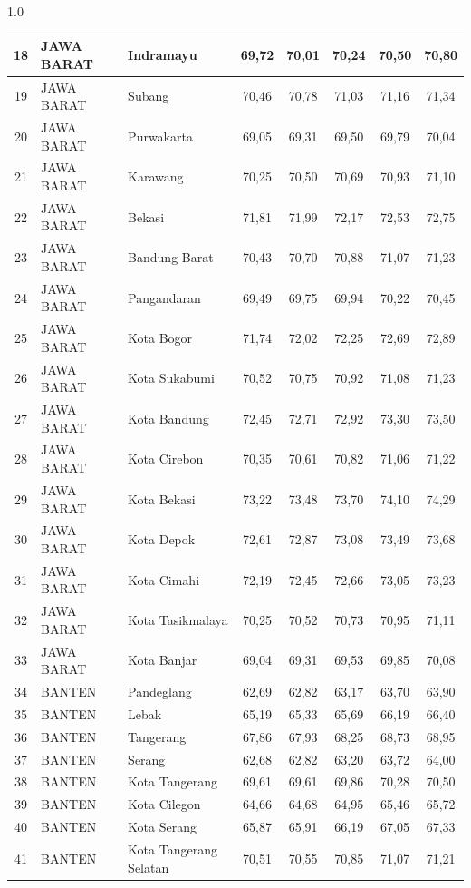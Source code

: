 \begin{spacing}{1.0}
\begin{longtable}{|c|p{2.2cm}|p{2.8cm}|c|c|c|c|c|}
18 & JAWA BARAT & Indramayu & 69,72 & 70,01 & 70,24 & 70,50 & 70,80 \\ \hline
19 & JAWA BARAT & Subang & 70,46 & 70,78 & 71,03 & 71,16 & 71,34 \\ \hline
20 & JAWA BARAT & Purwakarta & 69,05 & 69,31 & 69,50 & 69,79 & 70,04 \\ \hline
21 & JAWA BARAT & Karawang & 70,25 & 70,50 & 70,69 & 70,93 & 71,10 \\ \hline
22 & JAWA BARAT & Bekasi & 71,81 & 71,99 & 72,17 & 72,53 & 72,75 \\ \hline
23 & JAWA BARAT & Bandung Barat & 70,43 & 70,70 & 70,88 & 71,07 & 71,23 \\ \hline
24 & JAWA BARAT & Pangandaran & 69,49 & 69,75 & 69,94 & 70,22 & 70,45 \\ \hline
25 & JAWA BARAT & Kota Bogor & 71,74 & 72,02 & 72,25 & 72,69 & 72,89 \\ \hline
26 & JAWA BARAT & Kota Sukabumi & 70,52 & 70,75 & 70,92 & 71,08 & 71,23 \\ \hline
27 & JAWA BARAT & Kota Bandung & 72,45 & 72,71 & 72,92 & 73,30 & 73,50 \\ \hline
28 & JAWA BARAT & Kota Cirebon & 70,35 & 70,61 & 70,82 & 71,06 & 71,22 \\ \hline
29 & JAWA BARAT & Kota Bekasi & 73,22 & 73,48 & 73,70 & 74,10 & 74,29 \\ \hline
30 & JAWA BARAT & Kota Depok & 72,61 & 72,87 & 73,08 & 73,49 & 73,68 \\ \hline
31 & JAWA BARAT & Kota Cimahi & 72,19 & 72,45 & 72,66 & 73,05 & 73,23 \\ \hline
32 & JAWA BARAT & Kota Tasikmalaya & 70,25 & 70,52 & 70,73 & 70,95 & 71,11 \\ \hline
33 & JAWA BARAT & Kota Banjar & 69,04 & 69,31 & 69,53 & 69,85 & 70,08 \\ \hline
34 & BANTEN & Pandeglang & 62,69 & 62,82 & 63,17 & 63,70 & 63,90 \\ \hline
35 & BANTEN & Lebak & 65,19 & 65,33 & 65,69 & 66,19 & 66,40 \\ \hline
36 & BANTEN & Tangerang & 67,86 & 67,93 & 68,25 & 68,73 & 68,95 \\ \hline
37 & BANTEN & Serang & 62,68 & 62,82 & 63,20 & 63,72 & 64,00 \\ \hline
38 & BANTEN & Kota Tangerang & 69,61 & 69,61 & 69,86 & 70,28 & 70,50 \\ \hline
39 & BANTEN & Kota Cilegon & 64,66 & 64,68 & 64,95 & 65,46 & 65,72 \\ \hline
40 & BANTEN & Kota Serang & 65,87 & 65,91 & 66,19 & 67,05 & 67,33 \\ \hline
41 & BANTEN & Kota Tangerang Selatan & 70,51 & 70,55 & 70,85 & 71,07 & 71,21 \\ \hline
\end{longtable}
\end{spacing}
\newpage

